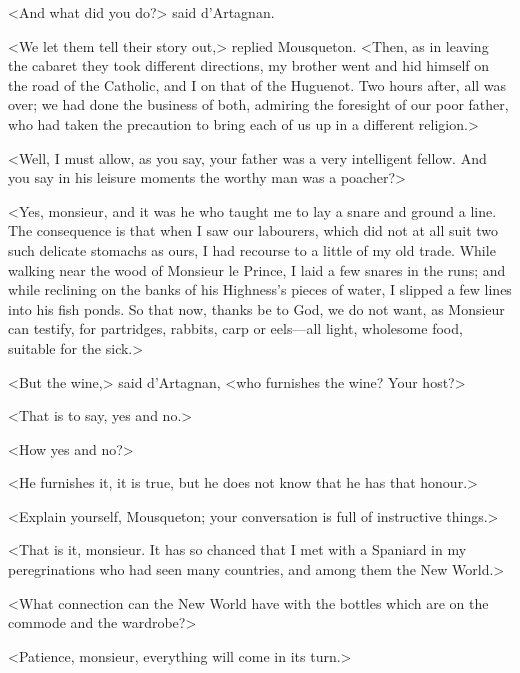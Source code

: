 <And what did you do?> said d'Artagnan. 

<We let them tell their story out,> replied Mousqueton. <Then, as in leaving the cabaret they took different directions, my brother went and hid himself on the road of the Catholic, and I on that of the Huguenot. Two hours after, all was over; we had done the business of both, admiring the foresight of our poor father, who had taken the precaution to bring each of us up in a different religion.> 

<Well, I must allow, as you say, your father was a very intelligent fellow. And you say in his leisure moments the worthy man was a poacher?> 

<Yes, monsieur, and it was he who taught me to lay a snare and ground a line. The consequence is that when I saw our labourers, which did not at all suit two such delicate stomachs as ours, I had recourse to a little of my old trade. While walking near the wood of Monsieur le Prince, I laid a few snares in the runs; and while reclining on the banks of his Highness's pieces of water, I slipped a few lines into his fish ponds. So that now, thanks be to God, we do not want, as Monsieur can testify, for partridges, rabbits, carp or eels---all light, wholesome food, suitable for the sick.> 

<But the wine,> said d'Artagnan, <who furnishes the wine? Your host?> 

<That is to say, yes and no.> 

<How yes and no?> 

<He furnishes it, it is true, but he does not know that he has that honour.> 

<Explain yourself, Mousqueton; your conversation is full of instructive things.> 

<That is it, monsieur. It has so chanced that I met with a Spaniard in my peregrinations who had seen many countries, and among them the New World.> 

<What connection can the New World have with the bottles which are on the commode and the wardrobe?> 

<Patience, monsieur, everything will come in its turn.> 

